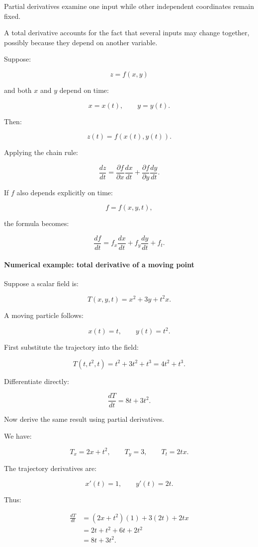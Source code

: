 Partial derivatives examine one input while other independent coordinates remain fixed.

A total derivative accounts for the fact that several inputs may change together, possibly because they depend on another variable.

Suppose:

\[
z=f(x,y)
\]

and both \(x\) and \(y\) depend on time:

\[
x=x(t),\qquad y=y(t).
\]

Then:

\[
z(t)=f(x(t),y(t)).
\]

Applying the chain rule:

\[
\boxed{ \frac{dz}{dt} = \frac{\partial f}{\partial x}\frac{dx}{dt} + \frac{\partial f}{\partial y}\frac{dy}{dt} }.
\]

If \(f\) also depends explicitly on time:

\[
f=f(x,y,t),
\]

the formula becomes:

\[
\boxed{ \frac{df}{dt} = f_x\frac{dx}{dt} + f_y\frac{dy}{dt} + f_t }.
\]

\paragraph{Numerical example: total derivative of a moving point}\label{02-foundations-ii-ch021-numerical-example-total-derivative-of-a-moving-point}

Suppose a scalar field is:

\[
T(x,y,t)=x^2+3y+t^2x.
\]

A moving particle follows:

\[
x(t)=t,\qquad y(t)=t^2.
\]

First substitute the trajectory into the field:

\[
T(t,t^2,t)=t^2+3t^2+t^3=4t^2+t^3.
\]

Differentiate directly:

\[
\boxed{\frac{dT}{dt}=8t+3t^2}.
\]

Now derive the same result using partial derivatives.

We have:

\[
T_x=2x+t^2,\qquad T_y=3,\qquad T_t=2tx.
\]

The trajectory derivatives are:

\[
x'(t)=1,\qquad y'(t)=2t.
\]

Thus:

\[
\begin{aligned} \frac{dT}{dt} &=(2x+t^2)(1)+3(2t)+2tx\\ &=2t+t^2+6t+2t^2\\ &=\boxed{8t+3t^2}. \end{aligned}
\]

